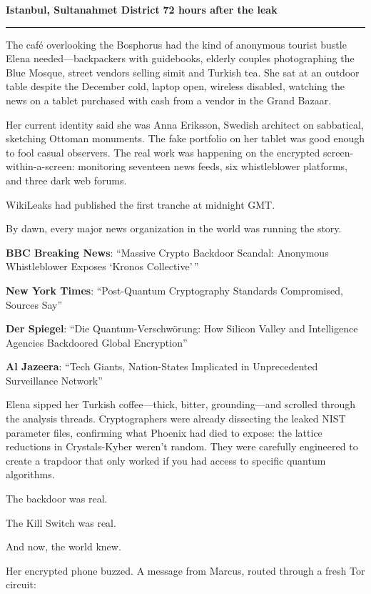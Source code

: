 \textbf{Istanbul, Sultanahmet District} \textbf{72 hours after the leak}

\begin{center}\rule{0.5\linewidth}{0.5pt}\end{center}

The café overlooking the Bosphorus had the kind of anonymous tourist bustle Elena needed---backpackers with guidebooks, elderly couples photographing the Blue Mosque, street vendors selling simit and Turkish tea. She sat at an outdoor table despite the December cold, laptop open, wireless disabled, watching the news on a tablet purchased with cash from a vendor in the Grand Bazaar.

Her current identity said she was Anna Eriksson, Swedish architect on sabbatical, sketching Ottoman monuments. The fake portfolio on her tablet was good enough to fool casual observers. The real work was happening on the encrypted screen-within-a-screen: monitoring seventeen news feeds, six whistleblower platforms, and three dark web forums.

WikiLeaks had published the first tranche at midnight GMT.

By dawn, every major news organization in the world was running the story.

\textbf{BBC Breaking News}: ``Massive Crypto Backdoor Scandal: Anonymous Whistleblower Exposes `Kronos Collective'\,''

\textbf{New York Times}: ``Post-Quantum Cryptography Standards Compromised, Sources Say''

\textbf{Der Spiegel}: ``Die Quantum-Verschwörung: How Silicon Valley and Intelligence Agencies Backdoored Global Encryption''

\textbf{Al Jazeera}: ``Tech Giants, Nation-States Implicated in Unprecedented Surveillance Network''

Elena sipped her Turkish coffee---thick, bitter, grounding---and scrolled through the analysis threads. Cryptographers were already dissecting the leaked NIST parameter files, confirming what Phoenix had died to expose: the lattice reductions in Crystals-Kyber weren't random. They were carefully engineered to create a trapdoor that only worked if you had access to specific quantum algorithms.

The backdoor was real.

The Kill Switch was real.

And now, the world knew.

Her encrypted phone buzzed. A message from Marcus, routed through a fresh Tor circuit:

